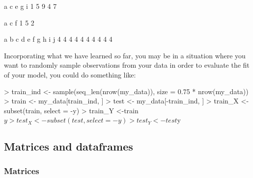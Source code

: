 \documentclass[answers]{exam}
\begin{document}
\begin{solution}
\begin{Schunk}
\begin{Soutput}
a c e g i 
1 5 9 4 7 
\end{Soutput}
\end{Schunk}
\begin{Schunk}
\begin{Soutput}
a c f 
1 5 2 
\end{Soutput}
\end{Schunk}
\begin{Schunk}
\begin{Soutput}
a b c d e f g h i j 
4 4 4 4 4 4 4 4 4 4 
\end{Soutput}
\end{Schunk}
\end{solution}

\noindent Incorporating what we have learned so far, you may be in a situation where you want to randomly sample observations from your data in order to evaluate the fit of your model, you could do something like: 

\begin{Schunk}
\begin{Sinput}
> train_ind <- sample(seq_len(nrow(my_data)), size = 0.75 * nrow(my_data))
> train <- my_data[train_ind, ]
> test <- my_data[-train_ind, ]
> train_X <- subset(train, select = -y)
> train_Y <-train$y
> test_X <- subset(test, select = -y)
> test_Y <-test$y
\end{Sinput}
\end{Schunk}


\subsection{Matrices and dataframes}

\subsubsection{Matrices}
\end{document}
